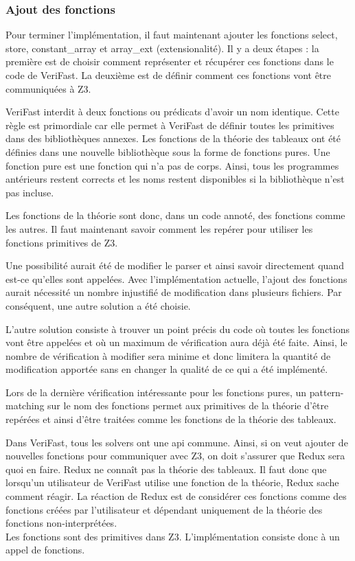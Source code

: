 \documentclass[11pt,openany]{article}
\newcommand{\verifast}{VeriFast}
\begin{document}
			
		\subsubsection{Ajout des fonctions}
	Pour terminer l'impl\'ementation, il faut maintenant ajouter les fonctions select, store, constant\_array et array\_ext (extensionalit\'e). Il y a deux \'etapes : la premi\`ere est de choisir comment repr\'esenter  et r\'ecup\'erer ces fonctions dans le code de \verifast{}. La deuxi\`eme est de d\'efinir comment ces fonctions vont \^etre communiqu\'ees \`a Z3.
	
		\verifast{} interdit \`a deux fonctions ou pr\'edicats d'avoir un nom identique. Cette r\`egle est primordiale car elle permet \`a \verifast{} de d\'efinir toutes les primitives dans des biblioth\`eques annexes. Les fonctions de la th\'eorie des tableaux ont \'et\'e d\'efinies dans une nouvelle biblioth\`eque sous la forme de fonctions pures. Une fonction pure est une fonction qui n'a pas de corps. Ainsi, tous les programmes ant\'erieurs restent corrects et les noms restent disponibles si la biblioth\`eque n'est pas incluse.
		
		Les fonctions de la th\'eorie sont donc, dans un code annot\'e, des fonctions comme les autres. Il faut maintenant savoir comment les rep\'erer pour utiliser les fonctions primitives de Z3.
		
		Une possibilit\'e aurait \'et\'e de modifier le parser et ainsi savoir directement quand est-ce qu'elles sont appel\'ees. Avec l'impl\'ementation actuelle, l'ajout des fonctions aurait n\'ecessit\'e un nombre injustifi\'e de modification dans plusieurs fichiers. Par cons\'equent, une autre solution a \'et\'e choisie. 
		
		L'autre solution consiste \`a trouver un point pr\'ecis du code o\`u toutes les fonctions vont \^etre appel\'ees et o\`u un maximum de v\'erification aura d\'ej\`a \'et\'e faite. Ainsi, le nombre de v\'erification \`a modifier sera minime et donc limitera la quantit\'e de modification apport\'ee sans en changer la qualit\'e de ce qui a \'et\'e impl\'ement\'e.
		
		Lors de la derni\`ere v\'erification int\'eressante pour les fonctions pures, un pattern-matching sur le nom des fonctions permet aux primitives de la th\'eorie d'\^etre rep\'er\'ees et ainsi d'\^etre trait\'ees comme les fonctions de la th\'eorie des tableaux.
		
		Dans \verifast{}, tous les solvers ont une api commune. Ainsi, si on veut ajouter de nouvelles fonctions pour communiquer avec Z3, on doit s'assurer que Redux sera quoi en faire.
			Redux ne conna\^it pas la th\'eorie des tableaux. Il faut donc que lorsqu'un utilisateur de \verifast{} utilise une fonction de la th\'eorie, Redux sache comment r\'eagir. La r\'eaction de Redux est de consid\'erer ces fonctions comme des fonctions cr\'e\'ees par l'utilisateur et d\'ependant uniquement de la th\'eorie des fonctions non-interpr\'et\'ees.\\
			Les fonctions sont des primitives dans Z3. L'impl\'ementation consiste donc \`a un appel de fonctions.
	
\end{document}

